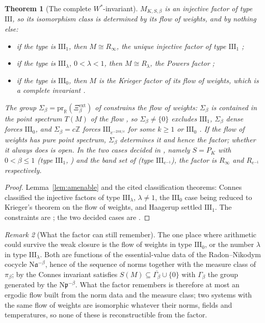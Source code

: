 \documentclass[11pt]{amsart}
\numberwithin{equation}{section}
\newtheorem{theorem}{Theorem}[section]
\theoremstyle{definition}
\theoremstyle{remark}
\newtheorem{remark}[theorem]{Remark}
\newcommand{\Z}{\mathbb{Z}}
\newcommand{\R}{\mathbb{R}}
\newcommand{\pp}{\mathfrak{p}}
\newcommand{\aaa}{\mathfrak{a}}
\newcommand{\Ns}{\mathrm{N}}
\begin{document}
\begin{theorem}[The complete $W^*$-invariant]\label{thm:complete}
$M_{K,S,\beta}$ is an injective factor of type $\mathrm{III}$, so its isomorphism class is
determined by its flow of weights, and by nothing else:
\begin{itemize}
\item if the type is $\mathrm{III}_1$, then $M\cong R_\infty$, the unique injective factor of
type $\mathrm{III}_1$ \cite{Haagerup};
\item if the type is $\mathrm{III}_\lambda$, $0<\lambda<1$, then $M\cong R_\lambda$, the Powers
factor \cite{Connes76};
\item if the type is $\mathrm{III}_0$, then $M$ is the Krieger factor of its flow of weights,
which is a complete invariant \cite{Krieger}.
\end{itemize}
The group $\Sigma_\beta=\mathrm{pr}_\R(\Xi^{\mathrm{ext}}_\beta)$ of \cite[Def.~1.1]{SeriesI}
constrains the flow of weights: $\Sigma_\beta$ is contained in the point spectrum $T(M)$ of
the flow \cite[Rem.~2.3]{SeriesI}, so $\Sigma_\beta\ne\{0\}$ excludes $\mathrm{III}_1$,
$\Sigma_\beta$ dense forces $\mathrm{III}_0$, and $\Sigma_\beta=c\Z$ forces
$\mathrm{III}_{e^{-2\pi k/c}}$ for some $k\ge1$ or $\mathrm{III}_0$ \cite[Prop.~2.2]{SeriesI}.
If the flow of weights has pure point spectrum, $\Sigma_\beta$ determines it and hence the
factor; whether it always does is open. In the two cases decided in \cite{SeriesI}, namely
$S=P_K$ with $0<\beta\le1$ (type $\mathrm{III}_1$, \cite[Thm.~3.2]{SeriesI}) and the band set
of \cite[Thm.~4.2]{SeriesI} (type $\mathrm{III}_{e^{-1}}$), the factor is $R_\infty$ and
$R_{e^{-1}}$ respectively.
\end{theorem}

\begin{proof}
Lemma~\ref{lem:amenable} and the cited classification theorems: Connes classified the
injective factors of type $\mathrm{III}_\lambda$, $\lambda\ne1$, the $\mathrm{III}_0$ case
being reduced to Krieger's theorem on the flow of weights, and Haagerup settled
$\mathrm{III}_1$. The constraints are \cite[Prop.~2.2 and Rem.~2.3]{SeriesI}; the two
decided cases are \cite[Thm.~3.2, Thm.~4.2]{SeriesI}.
\end{proof}

\begin{remark}[What the factor can still remember]\label{rem:remember}
The one place where arithmetic could survive the weak closure is the flow of weights in
type $\mathrm{III}_0$, or the number $\lambda$ in type $\mathrm{III}_\lambda$. Both are
functions of the essential-value data of the Radon--Nikodym cocycle $\Ns\aaa^{-\beta}$, hence
of the sequence of norms together with the measure class of $\pi_\beta$; by
\cite[Prop.~6.1]{Main} the Connes invariant satisfies $S(M)\subseteq\overline{\Gamma_\beta}\cup\{0\}$
with $\Gamma_\beta$ the group generated by the $\Ns\pp^{-\beta}$. What the factor remembers
is therefore at most an ergodic flow built from the norm data and the measure class; two
systems with the same flow of weights are isomorphic whatever their norms, fields and
temperatures, so none of these is reconstructible from the factor.
\end{remark}
\end{document}
